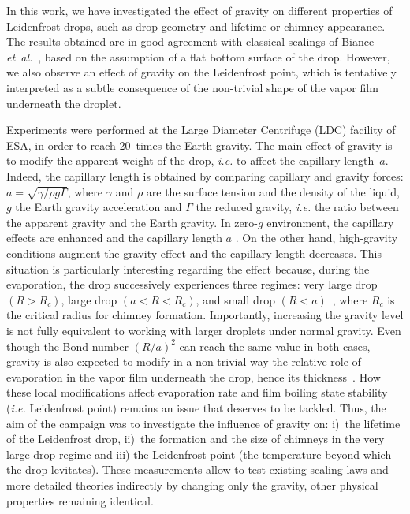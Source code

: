 \documentclass[doublecol,final]{epl2}
\begin{document}
In this work, we have investigated the effect of gravity on different properties of Leidenfrost drops, such as drop geometry and lifetime or chimney appearance. The results obtained are in good agreement with classical scalings of Biance \textit{et~al.}~\cite{epl17032bib3}, based on the assumption of a flat bottom surface of the drop. However, we also observe an  effect of gravity on the Leidenfrost point, which is tentatively interpreted as a subtle consequence of the non-trivial shape of the vapor film underneath the droplet.

Experiments were performed at the Large Diameter Centrifuge (LDC) facility of ESA, in order to reach 20~times the Earth gravity. The main effect of gravity is to modify the apparent weight of the drop, \textit{i.e.} to affect the capillary length~$a$. Indeed, the capillary length is obtained by comparing capillary and gravity forces: $a=\sqrt{\gamma/\rho g \Gamma}$, where $\gamma$ and $\rho$ are the surface tension and the density of the liquid, $g$ the Earth gravity acceleration and $\Gamma$ the reduced gravity, \textit{i.e.} the ratio between the apparent gravity and the Earth gravity. In zero-$g$ environment, the capillary effects are enhanced and the capillary length $a$ . On the other hand, high-gravity conditions augment the gravity effect and the capillary length decreases. This situation is particularly interesting regarding the  effect because, during the evaporation, the drop successively experiences three regimes: very large drop $(R > R_c)$, large drop $(a < R < R_c)$, and small drop $(R < a)$~\cite{epl17032bib3}, where $R_c$ is the critical radius for chimney formation. Importantly, increasing the gravity level is not fully equivalent to working with larger droplets under normal gravity. Even though the Bond number $(R/a)^2$ can reach the same value in both cases, gravity is also expected to modify in a non-trivial way the relative role of evaporation in the vapor film underneath the drop, hence its thickness~\cite{epl17032bib3,epl17032bib8}. How these local modifications affect evaporation rate and film boiling state stability (\textit{i.e.} Leidenfrost point) remains an issue that deserves to be tackled. Thus, the aim of the campaign was to investigate the influence of gravity on: i)~the lifetime of the Leidenfrost drop, ii)~the formation and the size of chimneys in the very large-drop regime and iii) the Leidenfrost point (the temperature beyond which the drop levitates). These measurements allow to test existing scaling laws and more detailed theories indirectly by changing only the gravity, other physical properties remaining identical.
\end{document}
